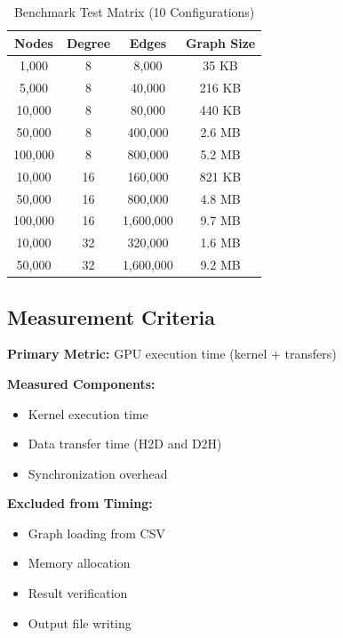 \documentclass[11pt,a4paper]{article}
\begin{document}
\begin{table}[H]
\centering
\caption{Benchmark Test Matrix (10 Configurations)}
\begin{tabular}{@{}cccc@{}}
\toprule
\textbf{Nodes} & \textbf{Degree} & \textbf{Edges} & \textbf{Graph Size} \\ \midrule
1,000          & 8               & 8,000          & 35 KB               \\
5,000          & 8               & 40,000         & 216 KB              \\
10,000         & 8               & 80,000         & 440 KB              \\
50,000         & 8               & 400,000        & 2.6 MB              \\
100,000        & 8               & 800,000        & 5.2 MB              \\
10,000         & 16              & 160,000        & 821 KB              \\
50,000         & 16              & 800,000        & 4.8 MB              \\
100,000        & 16              & 1,600,000      & 9.7 MB              \\
10,000         & 32              & 320,000        & 1.6 MB              \\
50,000         & 32              & 1,600,000      & 9.2 MB              \\
\bottomrule
\end{tabular}
\end{table}

\subsection{Measurement Criteria}

\textbf{Primary Metric:} GPU execution time (kernel + transfers)

\textbf{Measured Components:}
\begin{itemize}
    \item Kernel execution time
    \item Data transfer time (H2D and D2H)
    \item Synchronization overhead
\end{itemize}

\textbf{Excluded from Timing:}
\begin{itemize}
    \item Graph loading from CSV
    \item Memory allocation
    \item Result verification
    \item Output file writing
\end{itemize}
\end{document}
